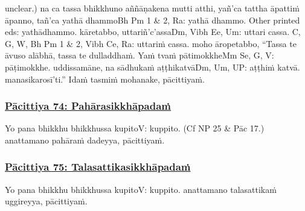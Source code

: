 unclear.) na ca tassa bhikkhuno aññāṇakena mutti atthi, yañ'ca tattha āpattiṁ āpanno, tañ'ca yathā dhammo\makeatletter\hyperlink{endnote-appendix}\makeatother Bh Pm 1 & 2, Ra: yathā dhammo. Other printed eds: yathādhammo. kāretabbo, uttariñ'c'assa\makeatletter\hyperlink{endnote-appendix}\makeatother Dm, Vibh Ee, Um: uttari cassa. C, G, W, Bh Pm 1 & 2, Vibh Ce, Ra: uttariṁ cassa. moho āropetabbo, ``Tassa te āvuso alābhā, tassa te dulladdhaṁ. Yaṁ tvaṁ pātimokkhe\makeatletter\hyperlink{endnote-appendix}\makeatother Mm Se, G, V: pāṭimokkhe. uddissamāne, na sādhukaṁ aṭṭhikatvā\makeatletter\hyperlink{endnote-appendix}\makeatother Dm, Um, UP: aṭṭhiṁ katvā. manasikarosī'ti.'' Idaṁ tasmiṁ mohanake, pācittiyaṁ.



\subsubsection*{\hyperref[exp74]{Pācittiya 74: Pahārasikkhāpadaṁ}}
\label{pac74}

Yo pana bhikkhu bhikkhussa kupito\makeatletter\hyperlink{endnote-appendix}\makeatother V: kuppito. (Cf NP 25 & Pāc 17.) anattamano pahāraṁ dadeyya, pācittiyaṁ.



\subsubsection*{\hyperref[exp75]{Pācittiya 75: Talasattikasikkhāpadaṁ}}
\label{pac75}

Yo pana bhikkhu bhikkhussa kupito\makeatletter\hyperlink{endnote-appendix}\makeatother V: kuppito. anattamano talasattikaṁ uggireyya, pācittiyaṁ.



